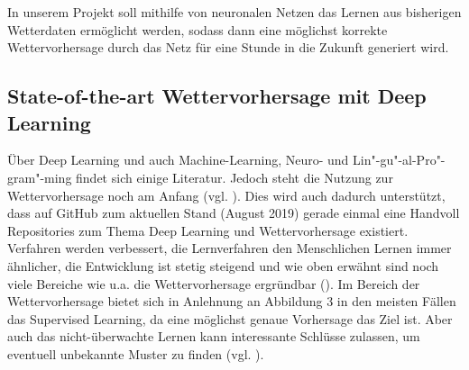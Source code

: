In unserem Projekt soll mithilfe von neuronalen Netzen das Lernen aus bisherigen Wetterdaten ermöglicht werden, sodass dann eine möglichst korrekte Wettervorhersage durch das Netz für eine Stunde in die Zukunft generiert wird.

\subsection{State-of-the-art Wettervorhersage mit Deep Learning}

Über Deep Learning und auch Machine-Learning, Neuro- und Lin"-gu"-al-Pro"-gram"-ming findet sich einige Literatur. Jedoch steht die Nutzung zur Wettervorhersage noch am Anfang (vgl. \cite{ChristophFrohlich.2019}). Dies wird auch dadurch unterstützt, dass auf GitHub zum aktuellen Stand (August 2019) gerade einmal eine Handvoll Repositories zum Thema Deep Learning und Wettervorhersage existiert. Verfahren werden verbessert, die Lernverfahren den Menschlichen Lernen immer ähnlicher, die Entwicklung ist stetig steigend und wie oben erwähnt sind noch viele Bereiche wie u.a. die Wettervorhersage  ergründbar (\cite[S. 103]{Wick.2017}). Im Bereich der Wettervorhersage bietet sich in Anlehnung an Abbildung 3 in den meisten Fällen das Supervised Learning, da eine möglichst genaue Vorhersage das Ziel ist. Aber auch das  nicht-überwachte Lernen kann interessante Schlüsse zulassen, um eventuell unbekannte Muster zu finden (vgl. \cite[S. 371]{Welsch.2018}). 
